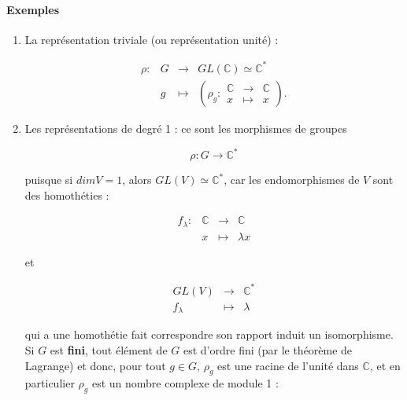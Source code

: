 \documentclass[french]{book}
\begin{document}
\paragraph{Exemples}

\begin{enumerate}
  \item La représentation triviale (ou représentation unité) :

  \[\begin{matrix}
  \rho : & G & \longrightarrow & GL(\mathbb{C}) \simeq \mathbb{C}^{*} \\
  \ & g & \longmapsto & \left( \rho_g : \begin{matrix}
   \mathbb{C} & \longrightarrow & \mathbb{C} \\
   x & \longmapsto & x
  \end{matrix}\right).
  \end{matrix}\]


    \item Les représentations de degré 1 : ce sont les morphismes de groupes

    \[
    \rho : G \longrightarrow \mathbb{C} ^{*}
    \]

    puisque si $dim V =1$, alors $GL(V) \simeq \mathbb{C}^{*}$, car les endomorphismes de $V$ sont des homothéties :


    \[\begin{matrix}
    f _{\lambda } : & \mathbb{C} & \longrightarrow & \mathbb{C} \\
    \ & x & \longmapsto & \lambda x
    \end{matrix}\]

    et

    \[\begin{matrix}
      GL(V) & \longrightarrow & \mathbb{C} ^{*} \\
      f_{\lambda} & \longmapsto & \lambda
    \end{matrix}\]


    qui a une homothétie fait correspondre son rapport induit un isomorphisme. Si $G$ est \textbf{fini}, tout élément de $G$ est d'ordre fini (par le théorème de Lagrange) et donc, pour tout $g \in G$, $\rho_g$ est une racine de l'unité dans $\mathbb{C}$, et en particulier $\rho_g$ est un nombre complexe de module 1 :


\end{enumerate}
\end{document}

